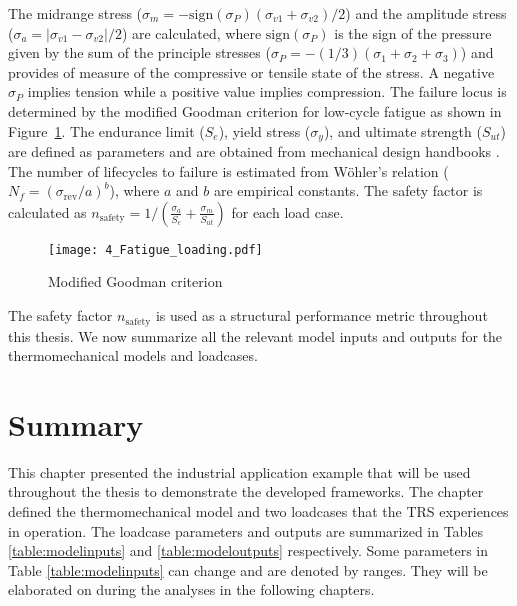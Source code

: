 The midrange stress ($\sigma_m = -\textrm{sign}(\sigma_P)\left( \sigma_{v1} + \sigma_{v2}\right) / 2$) and the amplitude stress ($\sigma_a = \left| \sigma_{v1} - \sigma_{v2}\right| / 2$) are calculated, where $\textrm{sign}(\sigma_P)$ is the sign of the pressure given by the sum of the principle stresses ($\sigma_P = -(1/3) (\sigma_1 + \sigma_2 + \sigma_3)$) and provides of measure of the compressive or tensile state of the stress. A negative $\sigma_P$ implies tension while a positive value implies compression. The failure locus is determined by the modified Goodman criterion for low-cycle fatigue as shown in Figure~\ref{fig:GMcrit}. The endurance limit ($S_e$), yield stress ($\sigma_y$), and ultimate strength ($S_{ut}$) are defined as parameters and are obtained from mechanical design handbooks \cite{Budynas2015}. The number of lifecycles to failure is estimated from W{\"o}hler's relation ($N_f = \left(\sigma_{\textrm{rev}}/a\right)^b$), where $a$ and $b$ are empirical constants. The safety factor is calculated as $n_{\textrm{safety}} = 1/\left({\frac{\sigma_a}{S_e}+\frac{\sigma_m}{S_{ut}}}\right)$ for each load case. 

\begin{figure}[h!]
    \centering
    \texttt{[image: 4\_Fatigue\_loading.pdf]}
    \caption{ \label{fig:GMcrit} Modified Goodman criterion }
\end{figure}

The safety factor $n_{\textrm{safety}}$ is used as a structural performance metric throughout this thesis. We now summarize all the relevant model inputs and outputs for the thermomechanical models and loadcases.

\section{Summary}
\label{sec:thermosummary}

This chapter presented the industrial application example that will be used throughout the thesis to demonstrate the developed frameworks. The chapter defined the thermomechanical model and two loadcases that the \ac{TRS} experiences in operation. The loadcase parameters and outputs are summarized in Tables \ref{table:modelinputs} and \ref{table:modeloutputs} respectively. Some parameters in Table \ref{table:modelinputs} can change and are denoted by ranges. They will be elaborated on during the analyses in the following chapters.

